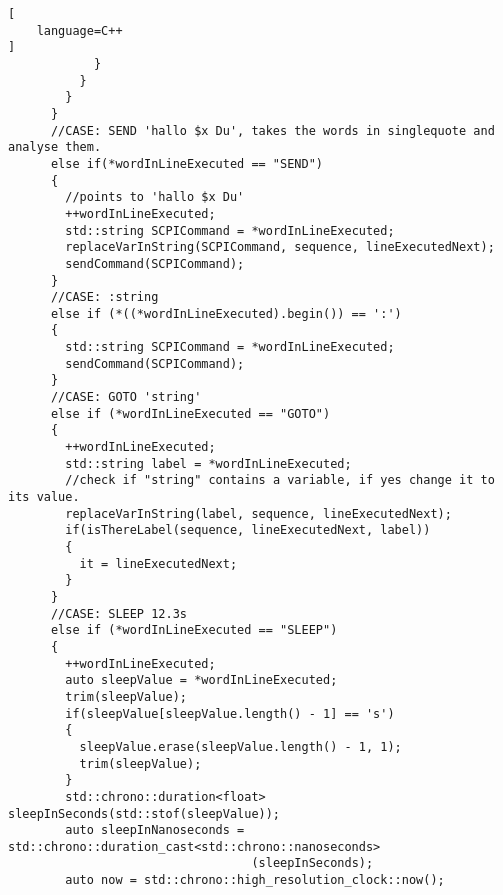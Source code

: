\begin{lstlisting}[
	language=C++
]
            }
          }
        }
      }
      //CASE: SEND 'hallo $x Du', takes the words in singlequote and analyse them.
      else if(*wordInLineExecuted == "SEND")
      {
        //points to 'hallo $x Du'
        ++wordInLineExecuted;
        std::string SCPICommand = *wordInLineExecuted;
        replaceVarInString(SCPICommand, sequence, lineExecutedNext);
        sendCommand(SCPICommand);
      }
      //CASE: :string
      else if (*((*wordInLineExecuted).begin()) == ':')
      {
        std::string SCPICommand = *wordInLineExecuted;
        sendCommand(SCPICommand);
      }
      //CASE: GOTO 'string'
      else if (*wordInLineExecuted == "GOTO")
      {
        ++wordInLineExecuted;
        std::string label = *wordInLineExecuted;
        //check if "string" contains a variable, if yes change it to its value.
        replaceVarInString(label, sequence, lineExecutedNext);
        if(isThereLabel(sequence, lineExecutedNext, label))
        {
          it = lineExecutedNext;
        }
      }
      //CASE: SLEEP 12.3s
      else if (*wordInLineExecuted == "SLEEP")
      {
        ++wordInLineExecuted;
        auto sleepValue = *wordInLineExecuted;
        trim(sleepValue);
        if(sleepValue[sleepValue.length() - 1] == 's')
        {
          sleepValue.erase(sleepValue.length() - 1, 1);
          trim(sleepValue);
        }
        std::chrono::duration<float> sleepInSeconds(std::stof(sleepValue));
        auto sleepInNanoseconds = std::chrono::duration_cast<std::chrono::nanoseconds>
                                  (sleepInSeconds);
        auto now = std::chrono::high_resolution_clock::now();


\end{lstlisting}
